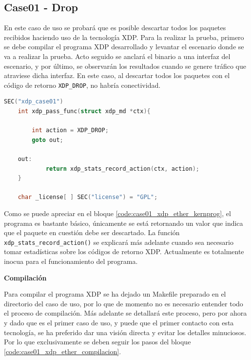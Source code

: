 \subsection{Case01 - Drop}
\label{xdp_ether_case01}

En este caso de uso se probará que es posible descartar todos los paquetes recibidos haciendo uso de la tecnología XDP. Para la realizar la prueba, primero se debe compilar el programa XDP desarrollado y levantar el escenario donde se va a realizar la prueba. Acto seguido se anclará el binario a una interfaz del escenario, y por último, se observarán los resultados cuando se genere tráfico que atraviese dicha interfaz. En este caso, al descartar todos los paquetes con el código de retorno \texttt{XDP\_DROP}, no habría conectividad.

\begin{lstlisting}[language=C, style=C-color, caption={Programa básico XDP - Case01},label=code:case01_xdp_ether_kernprog]
    SEC("xdp_case01")
    int xdp_pass_func(struct xdp_md *ctx){
    
    	int action = XDP_DROP;
    	goto out;
    
    out:
            return xdp_stats_record_action(ctx, action);
    }
    
    char _license[ ] SEC("license") = "GPL";
\end{lstlisting}
\vspace{0.5cm}

Como se puede apreciar en el bloque \ref{code:case01_xdp_ether_kernprog}, el programa es bastante básico, únicamente se está retornando un valor que indica que el paquete en cuestión debe ser descartado. La función \texttt{xdp\_stats\_record\_action()} se explicará más adelante cuando sea necesario tomar estadísticas sobre los códigos de retorno XDP. Actualmente es totalmente inocua para el funcionamiento del programa. 


\vspace{1cm}
\textbf{Compilación}\\
\par

Para compilar el programa XDP se ha dejado un Makefile preparado en el directorio del caso de uso, por lo que de momento no es necesario entender todo el proceso de compilación. Más adelante se detallará este proceso, pero por ahora y dado que es el primer caso de uso, y puede que el primer contacto con esta tecnología, se ha preferido dar una visión directa y evitar los detalles minuciosos. Por lo que exclusivamente se deben seguir los pasos del bloque \ref{code:case01_xdp_ether_compilacion}.

